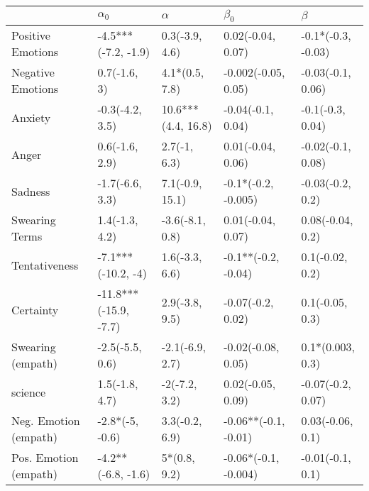 \begin{tabular}{lllll}
\toprule
{} &             $\alpha_0$ &            $\alpha$ &             $\beta_0$ &             $\beta$ \\
\midrule
Positive Emotions     &    -4.5***(-7.2, -1.9) &      0.3(-3.9, 4.6) &     0.02(-0.04, 0.07) &  -0.1*(-0.3, -0.03) \\
Negative Emotions     &           0.7(-1.6, 3) &      4.1*(0.5, 7.8) &   -0.002(-0.05, 0.05) &   -0.03(-0.1, 0.06) \\
Anxiety               &        -0.3(-4.2, 3.5) &  10.6***(4.4, 16.8) &     -0.04(-0.1, 0.04) &    -0.1(-0.3, 0.04) \\
Anger                 &         0.6(-1.6, 2.9) &        2.7(-1, 6.3) &     0.01(-0.04, 0.06) &   -0.02(-0.1, 0.08) \\
Sadness               &        -1.7(-6.6, 3.3) &     7.1(-0.9, 15.1) &   -0.1*(-0.2, -0.005) &    -0.03(-0.2, 0.2) \\
Swearing Terms        &         1.4(-1.3, 4.2) &     -3.6(-8.1, 0.8) &     0.01(-0.04, 0.07) &    0.08(-0.04, 0.2) \\
Tentativeness         &     -7.1***(-10.2, -4) &      1.6(-3.3, 6.6) &   -0.1**(-0.2, -0.04) &     0.1(-0.02, 0.2) \\
Certainty             &  -11.8***(-15.9, -7.7) &      2.9(-3.8, 9.5) &     -0.07(-0.2, 0.02) &     0.1(-0.05, 0.3) \\
Swearing (empath)     &        -2.5(-5.5, 0.6) &     -2.1(-6.9, 2.7) &    -0.02(-0.08, 0.05) &    0.1*(0.003, 0.3) \\
science               &         1.5(-1.8, 4.7) &       -2(-7.2, 3.2) &     0.02(-0.05, 0.09) &   -0.07(-0.2, 0.07) \\
Neg. Emotion (empath) &        -2.8*(-5, -0.6) &      3.3(-0.2, 6.9) &  -0.06**(-0.1, -0.01) &    0.03(-0.06, 0.1) \\
Pos. Emotion (empath) &     -4.2**(-6.8, -1.6) &        5*(0.8, 9.2) &  -0.06*(-0.1, -0.004) &    -0.01(-0.1, 0.1) \\
\bottomrule
\end{tabular}
